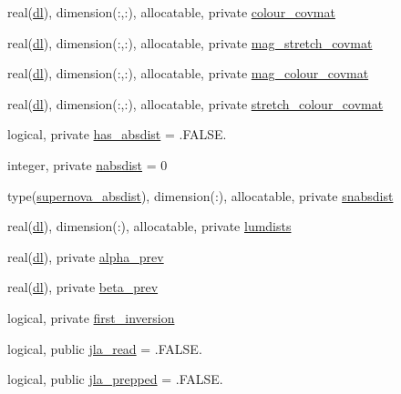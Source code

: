 \begin{DoxyCompactItemize}
\item 
real(\mbox{\hyperlink{namespacejla_a3aa6435b4e08f1d532390186ac608741}{dl}}), dimension(\+:,\+:), allocatable, private \mbox{\hyperlink{namespacejla_a3b95b3e7a5ea31feba90bf7c9b9e8fc6}{colour\+\_\+covmat}}
\item 
real(\mbox{\hyperlink{namespacejla_a3aa6435b4e08f1d532390186ac608741}{dl}}), dimension(\+:,\+:), allocatable, private \mbox{\hyperlink{namespacejla_a6d4dd0b09a0e00323bc4f74df2235901}{mag\+\_\+stretch\+\_\+covmat}}
\item 
real(\mbox{\hyperlink{namespacejla_a3aa6435b4e08f1d532390186ac608741}{dl}}), dimension(\+:,\+:), allocatable, private \mbox{\hyperlink{namespacejla_a0eab7a6fccee7c07f28748c3bcb2c260}{mag\+\_\+colour\+\_\+covmat}}
\item 
real(\mbox{\hyperlink{namespacejla_a3aa6435b4e08f1d532390186ac608741}{dl}}), dimension(\+:,\+:), allocatable, private \mbox{\hyperlink{namespacejla_a22070c0614b05ee2b305729eddeb3d9d}{stretch\+\_\+colour\+\_\+covmat}}
\item 
logical, private \mbox{\hyperlink{namespacejla_a2eb95509fe329afa263dcfa2727d6b41}{has\+\_\+absdist}} = .F\+A\+L\+S\+E.
\item 
integer, private \mbox{\hyperlink{namespacejla_ac196ce11e9bc46a1f0f7190de071358a}{nabsdist}} = 0
\item 
type(\mbox{\hyperlink{structjla_1_1supernova__absdist}{supernova\+\_\+absdist}}), dimension(\+:), allocatable, private \mbox{\hyperlink{namespacejla_ac714ae18a12d4b4a726b05c017fd1e92}{snabsdist}}
\item 
real(\mbox{\hyperlink{namespacejla_a3aa6435b4e08f1d532390186ac608741}{dl}}), dimension(\+:), allocatable, private \mbox{\hyperlink{namespacejla_a488389e4c0ef651c499c3c48d6bee7ef}{lumdists}}
\item 
real(\mbox{\hyperlink{namespacejla_a3aa6435b4e08f1d532390186ac608741}{dl}}), private \mbox{\hyperlink{namespacejla_ade47fc5cee67934ebf1deb3f971e55ba}{alpha\+\_\+prev}}
\item 
real(\mbox{\hyperlink{namespacejla_a3aa6435b4e08f1d532390186ac608741}{dl}}), private \mbox{\hyperlink{namespacejla_a6ce045a151cda5e7f1d37adeac58eb4d}{beta\+\_\+prev}}
\item 
logical, private \mbox{\hyperlink{namespacejla_a7e32750158b057376c58db729873f935}{first\+\_\+inversion}}
\item 
logical, public \mbox{\hyperlink{namespacejla_a408c4f01bb785e06e2a2555aa770e090}{jla\+\_\+read}} = .F\+A\+L\+S\+E.
\item 
logical, public \mbox{\hyperlink{namespacejla_a8a48484fda3925329cb345d9b671b56b}{jla\+\_\+prepped}} = .F\+A\+L\+S\+E.
\end{DoxyCompactItemize}


